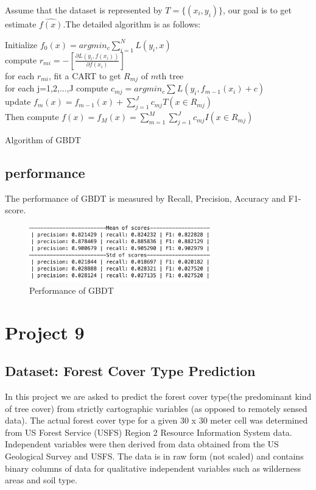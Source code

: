 \documentclass[11pt,en]{elegantpaper}
\begin{document}
Assume that the dataset is represented by $T=\{(x_i, y_i)\}$, our goal is to get estimate $\hat{f(x)}$.The detailed algorithm is as follows:

\begin{algorithm}[H]
\SetAlgoLined
{}
Initialize $f_0(x) = argmin_c \sum_{i=1}^N L(y_i, x)$\\
{
  	{
	compute $r_{mi} = -[\frac{\partial L(y_i, f(x_i))}{\partial f(x_i)}]$\\
	for each $r_{mi}$, fit a CART to get $R_{mj}$ of $m$th tree\\
	for each j=1,2,...,J compute $c_{mj} = argmin_c \sum L(y_i, f_{m-1}(x_i)+c)$\\
	update $f_m(x) = f_{m-1}(x) + \sum_{j=1}^J c_{mj}T(x \in R_{mj})$\\
	}
  Then compute $\hat{f(x)} = f_M(x) = \sum_{m=1}^M \sum_{j=1}^J c_{mj}I (x \in R_{mj})$
}
\caption{Algorithm of GBDT}
\end{algorithm}

\subsection*{performance}
The performance of GBDT is measured by Recall, Precision, Accuracy and F1-score.

\begin{figure}[H]
	\centering
	\includegraphics[width=0.7\textwidth]{image/gbdt_perf.png}
	\caption{Performance of GBDT}
	\label{gbdt1_performance}
\end{figure}

\section{Project 9}
\subsection{Dataset: Forest Cover Type Prediction}
In this project we are asked to predict the forest cover type(the predominant kind of tree cover) from strictly cartographic variables (as opposed to remotely sensed data). The actual forest cover type for a given 30 x 30 meter cell was determined from US Forest Service (USFS) Region 2 Resource Information System data. Independent variables were then derived from data obtained from the US Geological Survey and USFS. The data is in raw form (not scaled) and contains binary columns of data for qualitative independent variables such as wilderness areas and soil type.
\end{document}
